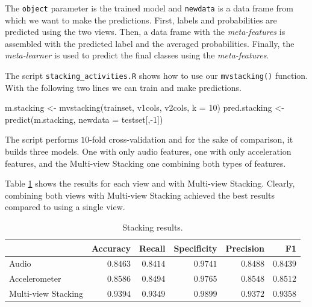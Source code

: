 \documentclass[
  11pt,
]{krantz}
\newenvironment{Shaded}{\begin{snugshade}}{\end{snugshade}}
\newcommand{\AttributeTok}[1]{\textcolor[rgb]{0.61,0.61,0.61}{#1}}
\newcommand{\DecValTok}[1]{\textcolor[rgb]{0.06,0.06,0.06}{#1}}
\newcommand{\FunctionTok}[1]{\textcolor[rgb]{0,0,0}{#1}}
\newcommand{\NormalTok}[1]{#1}
\newcommand{\OtherTok}[1]{\textcolor[rgb]{0.37,0.37,0.37}{#1}}
\newcommand{\SpecialCharTok}[1]{\textcolor[rgb]{0,0,0}{#1}}
\newcommand{\StringTok}[1]{\textcolor[rgb]{0.5,0.5,0.5}{#1}}
\begin{document}
\begin{Shaded}
\end{Shaded}

The \texttt{object} parameter is the trained model and \texttt{newdata} is a data frame from which we want to make the predictions. First, labels and probabilities are predicted using the two views. Then, a data frame with the \emph{meta-features} is assembled with the predicted label and the averaged probabilities. Finally, the \emph{meta-learner} is used to predict the final classes using the \emph{meta-features}.

The script \texttt{stacking\_activities.R} shows how to use our \texttt{mvstacking()} function. With the following two lines we can train and make predictions.

\begin{Shaded}
\begin{Highlighting}[]
\NormalTok{m.stacking }\OtherTok{\textless{}{-}} \FunctionTok{mvstacking}\NormalTok{(trainset, v1cols, v2cols, }\AttributeTok{k =} \DecValTok{10}\NormalTok{)}
\NormalTok{pred.stacking }\OtherTok{\textless{}{-}} \FunctionTok{predict}\NormalTok{(m.stacking, }\AttributeTok{newdata =}\NormalTok{ testset[,}\SpecialCharTok{{-}}\DecValTok{1}\NormalTok{])}
\end{Highlighting}
\end{Shaded}

The script performs \(10\)-fold cross-validation and for the sake of comparison, it builds three models. One with only audio features, one with only acceleration features, and the Multi-view Stacking one combining both types of features.

Table \ref{tab:stackingResults} shows the results for each view and with Multi-view Stacking. Clearly, combining both views with Multi-view Stacking achieved the best results compared to using a single view.

\begin{table}

\caption{\label{tab:stackingResults}Stacking results.}
\centering
\begin{tabular}[t]{l|r|r|r|r|r}
\hline
  & \textbf{Accuracy} & \textbf{Recall} & \textbf{Specificity} & \textbf{Precision} & \textbf{F1}\\
\hline
Audio & $0.8463$ & $0.8414$ & $0.9741$ & $0.8488$ & $0.8439$\\
\hline
Accelerometer & $0.8586$ & $0.8494$ & $0.9765$ & $0.8548$ & $0.8512$\\
\hline
Multi-view Stacking & $0.9394$ & $0.9349$ & $0.9899$ & $0.9372$ & $0.9358$\\
\hline
\end{tabular}
\end{table}
\end{document}
